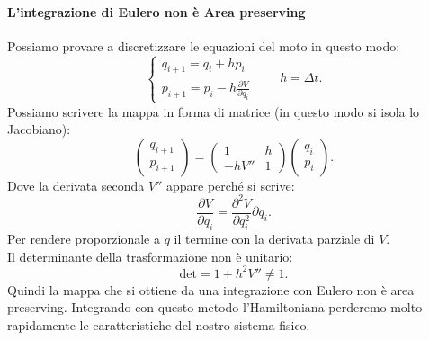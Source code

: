 \paragraph{L'integrazione di Eulero non è Area preserving}%
\label{par:Integrazione di Eulero}
Possiamo provare a discretizzare le equazioni del moto in questo modo:
\[
    \begin{cases}
        q_{i+1}=q_i + hp_i\\
	p_{i+1}=p_i - h \frac{\partial V}{\partial q_i} 
    \end{cases}
    \qquad
    h = \Delta t
.\] 
Possiamo scrivere la mappa in forma di matrice (in questo modo si isola lo Jacobiano):
\[
    \begin{pmatrix} q_{i+1}\\ p_{i+1} \end{pmatrix} =
    \begin{pmatrix} 
	1      & h \\
	- hV'' & 1
    \end{pmatrix} 
    \begin{pmatrix} q_i \\p_i \end{pmatrix}
.\] 
Dove la derivata seconda $V''$ appare perché si scrive:
\[
    \frac{\partial V}{\partial q_i} = \frac{\partial ^2V}{\partial q_i^2} \partial q_i
.\] 
Per rendere proporzionale a $q$ il termine con la derivata parziale di $V$. \\
Il determinante della trasformazione non è unitario:
\[
    \text{det} = 1 + h^2V'' \neq 1
.\] 
Quindi la mappa che si ottiene da una integrazione con Eulero non è area preserving. Integrando con questo metodo l'Hamiltoniana perderemo molto rapidamente le caratteristiche del nostro sistema fisico.
